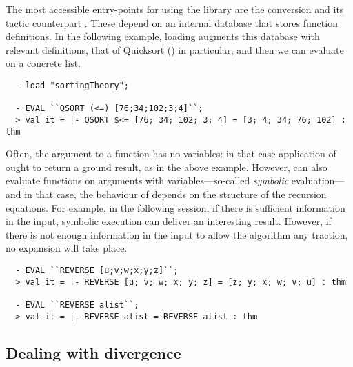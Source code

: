 The most accessible entry-points for using the  library
are the conversion  and its tactic counterpart
.  These depend on an internal database that stores
function definitions. In the following example, loading 
augments this database with relevant definitions, that of Quicksort
() in particular, and then we can evaluate
 on a concrete list.
%
\setcounter{sessioncount}{0}
\begin{session}
\begin{verbatim}
  - load "sortingTheory";

  - EVAL ``QSORT (<=) [76;34;102;3;4]``;
  > val it = |- QSORT $<= [76; 34; 102; 3; 4] = [3; 4; 34; 76; 102] : thm
\end{verbatim}
\end{session}
Often, the argument to a function has no variables: in that case
application of  ought to return a ground result,
as in the above example. However,  can also evaluate functions on
arguments with variables---so-called \emph{symbolic} evaluation---and
in that case, the behaviour of  depends on the structure of the
recursion equations. For example, in the following session, if there is
sufficient information in the input, symbolic execution can deliver
an interesting result. However, if there is not enough information
in the input to allow the algorithm any traction, no expansion will
take place.
%
\begin{session}
\begin{verbatim}
  - EVAL ``REVERSE [u;v;w;x;y;z]``;
  > val it = |- REVERSE [u; v; w; x; y; z] = [z; y; x; w; v; u] : thm

  - EVAL ``REVERSE alist``;
  > val it = |- REVERSE alist = REVERSE alist : thm
\end{verbatim}
\end{session}
%

\subsection{Dealing with divergence}

